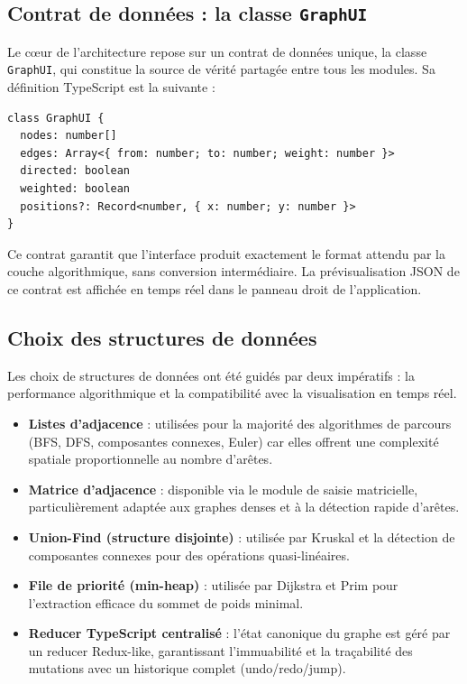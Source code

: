 \documentclass[a4paper,12pt]{report}
\begin{document}
\subsection{Contrat de données : la classe \texttt{GraphUI}}

Le cœur de l'architecture repose sur un contrat de données unique, la classe \texttt{GraphUI},
qui constitue la source de vérité partagée entre tous les modules. Sa définition TypeScript est
la suivante :

\begin{verbatim}
class GraphUI {
  nodes: number[]
  edges: Array<{ from: number; to: number; weight: number }>
  directed: boolean
  weighted: boolean
  positions?: Record<number, { x: number; y: number }>
}
\end{verbatim}

Ce contrat garantit que l'interface produit exactement le format attendu par la couche
algorithmique, sans conversion intermédiaire. La prévisualisation JSON de ce contrat est
affichée en temps réel dans le panneau droit de l'application.

\subsection{Choix des structures de données}

Les choix de structures de données ont été guidés par deux impératifs : la performance
algorithmique et la compatibilité avec la visualisation en temps réel.

\begin{itemize}
    \item \textbf{Listes d'adjacence} : utilisées pour la majorité des algorithmes de parcours
          (BFS, DFS, composantes connexes, Euler) car elles offrent une complexité spatiale
          proportionnelle au nombre d'arêtes.
    \item \textbf{Matrice d'adjacence} : disponible via le module de saisie matricielle,
          particulièrement adaptée aux graphes denses et à la détection rapide d'arêtes.
    \item \textbf{Union-Find (structure disjointe)} : utilisée par Kruskal et la détection
          de composantes connexes pour des opérations quasi-linéaires.
    \item \textbf{File de priorité (min-heap)} : utilisée par Dijkstra et Prim pour
          l'extraction efficace du sommet de poids minimal.
    \item \textbf{Reducer TypeScript centralisé} : l'état canonique du graphe est géré par
          un reducer Redux-like, garantissant l'immuabilité et la traçabilité des mutations
          avec un historique complet (undo/redo/jump).
\end{itemize}
\end{document}
